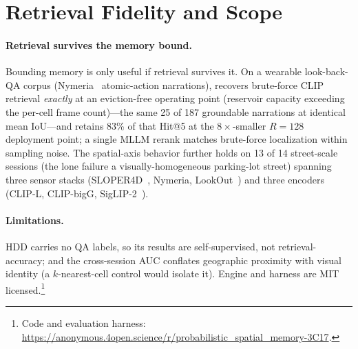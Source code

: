 
\section{Retrieval Fidelity and Scope}
\label{sec:validation}

\paragraph{Retrieval survives the memory bound.}
Bounding memory is only useful if retrieval survives it. On a wearable
look-back-QA corpus (Nymeria~\cite{ma2024nymeria} atomic-action
narrations), \psm{} recovers brute-force CLIP retrieval \emph{exactly} at
an eviction-free operating point (reservoir capacity exceeding the
per-cell frame count)---the same 25 of 187 groundable narrations at
identical mean IoU---and retains 83\% of that Hit@5 at the
$8\times$-smaller $R{=}128$ deployment point; a single MLLM rerank matches
brute-force localization within sampling noise. The spatial-axis behavior
further holds on 13 of 14 street-scale sessions (the lone failure a
visually-homogeneous parking-lot street) spanning three sensor stacks
(SLOPER4D~\cite{dai2023sloper4d}, Nymeria, LookOut~\cite{pan2025lookout})
and three encoders (CLIP-L, CLIP-bigG, SigLIP-2~\cite{tschannen2025siglip2}).

\paragraph{Limitations.}
HDD carries no QA labels, so its results are self-supervised, not
retrieval-accuracy; and the cross-session AUC conflates geographic proximity
with visual identity (a $k$-nearest-cell control would isolate it). Engine and harness are MIT
licensed.\footnote{Code and evaluation harness: \url{https://anonymous.4open.science/r/probabilistic_spatial_memory-3C17}.}
